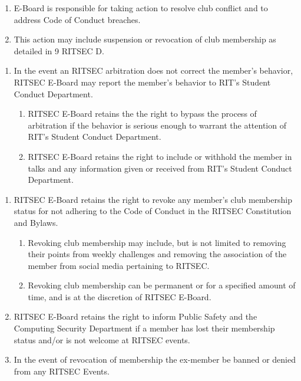 
\begin{enumerate}
      \item E-Board is responsible for taking action to resolve club conflict and to
            address Code of Conduct breaches.
      \item This action may include suspension or revocation of club membership as detailed
            in 9 RITSEC D.
\end{enumerate}


\begin{enumerate}
      \item In the event an RITSEC arbitration does not correct the member's behavior,
            RITSEC E-Board may report the member's behavior to RIT's Student Conduct
            Department.
            \begin{enumerate}
                  \item RITSEC E-Board retains the the right to bypass the process of arbitration if
                        the behavior is serious enough to warrant the attention of RIT's Student
                        Conduct Department.
                  \item RITSEC E-Board retains the right to include or withhold the member in talks and
                        any information given or received from RIT's Student Conduct Department.
            \end{enumerate}
\end{enumerate}


\begin{enumerate}
      \item RITSEC E-Board retains the right to revoke any member's club membership status
            for not adhering to the Code of Conduct in the RITSEC Constitution and Bylaws.
            \begin{enumerate}
                  \item Revoking club membership may include, but is not limited to removing their
                        points from weekly challenges and removing the association of the member from
                        social media pertaining to RITSEC\@.
                  \item Revoking club membership can be permanent or for a specified amount of time,
                        and is at the discretion of RITSEC E-Board.
            \end{enumerate}
      \item RITSEC E-Board retains the right to inform Public Safety and the Computing
            Security Department if a member has lost their membership status and/or is not
            welcome at RITSEC events.
      \item In the event of revocation of membership the ex-member be banned or denied from
            any RITSEC Events.
\end{enumerate}

